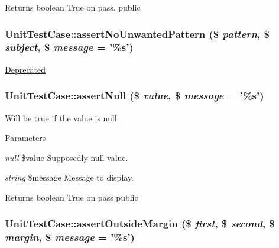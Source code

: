 \begin{DoxyReturn}{Returns}
boolean True on pass.  public 
\end{DoxyReturn}
\hypertarget{class_unit_test_case_a89d3dc4c132a2169978e08835f3e7764}{
\subsubsection[{assertNoUnwantedPattern}]{\setlength{\rightskip}{0pt plus 5cm}UnitTestCase::assertNoUnwantedPattern (\$ {\em pattern}, \/  \$ {\em subject}, \/  \$ {\em message} = {\ttfamily '\%s'})}}
\label{class_unit_test_case_a89d3dc4c132a2169978e08835f3e7764}
\begin{Desc}
\item[\hyperlink{deprecated__deprecated000019}{Deprecated}]\end{Desc}
\hypertarget{class_unit_test_case_a73855c4eea57a82974690087843f5b17}{
\subsubsection[{assertNull}]{\setlength{\rightskip}{0pt plus 5cm}UnitTestCase::assertNull (\$ {\em value}, \/  \$ {\em message} = {\ttfamily '\%s'})}}
\label{class_unit_test_case_a73855c4eea57a82974690087843f5b17}
Will be true if the value is null. 
\begin{DoxyParams}{Parameters}
\item[{\em null}]\$value Supposedly null value. \item[{\em string}]\$message Message to display. \end{DoxyParams}
\begin{DoxyReturn}{Returns}
boolean True on pass  public 
\end{DoxyReturn}
\hypertarget{class_unit_test_case_a8e3b8d5600731e494ad281ea165f2a53}{
\subsubsection[{assertOutsideMargin}]{\setlength{\rightskip}{0pt plus 5cm}UnitTestCase::assertOutsideMargin (\$ {\em first}, \/  \$ {\em second}, \/  \$ {\em margin}, \/  \$ {\em message} = {\ttfamily '\%s'})}}
